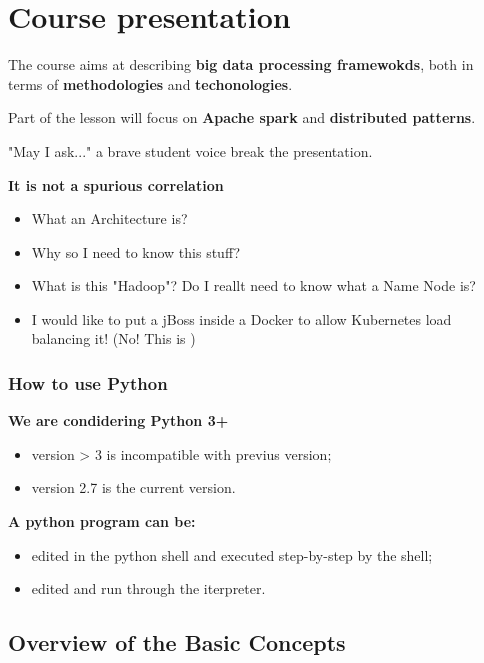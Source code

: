\section{Course presentation}



The course aims at describing \textbf{big data processing framewokds}, both in terms of \textbf{methodologies} and \textbf{techonologies}.

Part of the lesson will focus on \textbf{Apache spark} and \textbf{distributed patterns}.

"May I ask..." a brave student voice break the presentation.

\textbf{It is not a spurious correlation}
\begin{itemize}
	\item What an Architecture is? 
	\item Why so I need to know this stuff?
	\item What is this "Hadoop"? Do I reallt need to know what a Name Node is?
	\item I would like to put a jBoss inside a Docker to allow Kubernetes load balancing it! (No! This is )
\end{itemize}

\subsubsection{How to use Python}	
\textbf{We are condidering Python 3+}
\begin{itemize}
	\item version > 3 is incompatible with previus version;
	\item version 2.7 is the current version.
\end{itemize}
\textbf{A python program can be:}
\begin{itemize}
	\item edited in the python shell and executed step-by-step by the shell;
	\item edited and run through the iterpreter.
\end{itemize}

\subsection{Overview of the Basic Concepts}	


